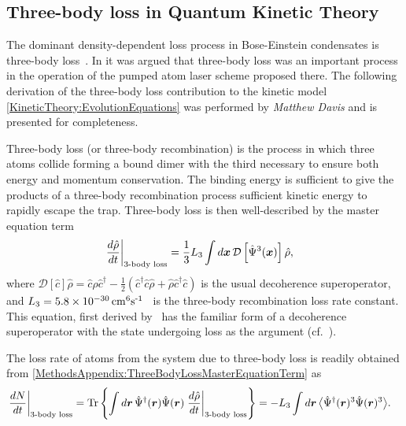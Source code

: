\subsection{Three-body loss in Quantum Kinetic Theory}
\label{MethodsAppendix:QKT3BodyLoss}

The dominant density-dependent loss process in Bose-Einstein condensates is three-body loss~\citep{Burt:1997fk,Soding:1999}. In  it was argued that three-body loss was an important process in the operation of the pumped atom laser scheme proposed there.  The following derivation of the three-body loss contribution to the kinetic model \eqref{KineticTheory:EvolutionEquations} was performed by \emph{Matthew Davis} and is presented for completeness.

Three-body loss (or three-body recombination) is the process in which three atoms collide forming a bound dimer with the third necessary to ensure both energy and momentum conservation.  The binding energy is sufficient to give the products of a three-body recombination process sufficient kinetic energy to rapidly escape the trap.  Three-body loss is then well-described by the master equation term
\begin{align}
    \left. \frac{d \hat{\rho}}{d t}\right|_\text{3-body loss} &= \frac{1}{3}L_3 \int d \vect{x} \,\mathcal{D} \left[ \hat{\Psi}^3(\vect{x}) \right] \hat{\rho},
    \label{MethodsAppendix:ThreeBodyLossMasterEquationTerm}
\end{align}
where $\mathcal{D}[\hat{c}]\hat{\rho} = \hat{c}\hat{\rho} \hat{c}^\dagger - \frac{1}{2}(\hat{c}^\dagger \hat{c}\hat{\rho} + \hat{\rho} \hat{c}^\dagger \hat{c})$ is the usual decoherence superoperator, and $L_3 = \unit[5.8\times 10^{-30}]{cm\textsuperscript{6}s\textsuperscript{-1}}$~\citep{Burt:1997fk} is the three-body recombination loss rate constant.  This equation, first derived by~\citep{Jack:2002} has the familiar form of a decoherence superoperator with the state undergoing loss as the argument (cf.\ ). %

The loss rate of atoms from the system due to three-body loss is readily obtained from \eqref{MethodsAppendix:ThreeBodyLossMasterEquationTerm} as
\begin{align}
    \left.\frac{d N}{dt} \right|_\text{3-body loss} &=  \Tr\left\{\int d \vect{r}\,\hat{\Psi}^\dagger(\vect{r})\hat{\Psi}(\vect{r}) \left.\frac{d \hat{\rho}}{dt}\right|_\text{3-body loss} \right\} = - L_3 \int d \vect{r}\, \mean{\hat{\Psi}^\dagger(\vect{r})^3 \hat{\Psi}(\vect{r})^3}.
    \label{MethodsAppendix:ThreeBodyLossNumberLossRate}
\end{align}

